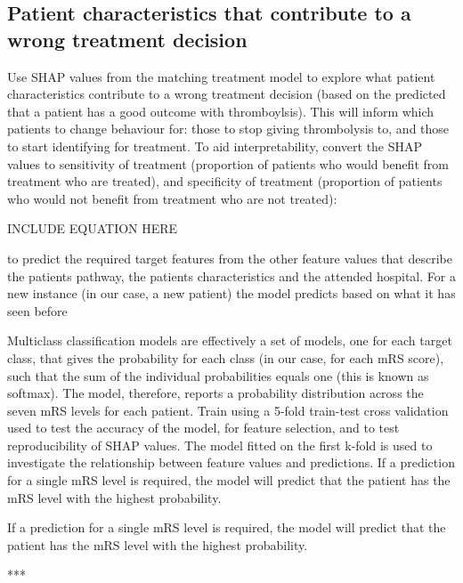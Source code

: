 \begin{enumerate}
\subsection{Patient characteristics that contribute to a wrong treatment decision}
Use SHAP values from the {matching treatment} model to explore what patient characteristics contribute to a wrong treatment decision (based on the predicted that a patient has a good outcome with thromboylsis). This will inform which patients to change behaviour for: those to stop giving thrombolysis to, and those to start identifying for treatment. To aid interpretability, convert the SHAP values to sensitivity of treatment (proportion of patients who would benefit from treatment who are treated), and specificity of treatment (proportion of patients who would not benefit from treatment who are not treated):

        INCLUDE EQUATION HERE


\end{enumerate}

 to predict the required target features from the other feature values that describe the patients pathway, the patients characteristics and the attended hospital. For a new instance (in our case, a new patient) the model predicts based on what it has seen before

 Multiclass classification models are effectively a set of models, one for each target class, that gives the probability for each class (in our case, for each mRS score), such that the sum of the individual probabilities equals one (this is known as softmax). The model, therefore, reports a probability distribution across the seven mRS levels for each patient. Train using a 5-fold train-test cross validation used to test the accuracy of the model, for feature selection, and to test reproducibility of SHAP values. The model fitted on the first k-fold is used to investigate the relationship between feature values and predictions. If a prediction for a single mRS level is required, the model will predict that the patient has the mRS level with the highest probability.

 If a prediction for a single mRS level is required, the model will predict that the patient has the mRS level with the highest probability.

***

